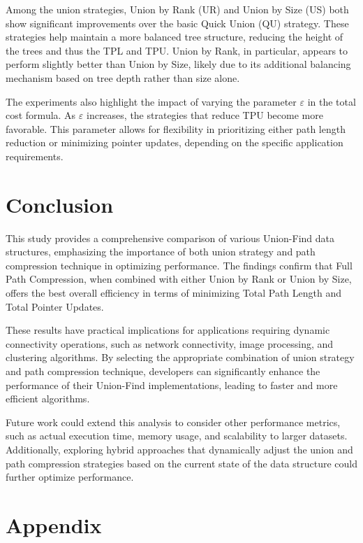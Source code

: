 \documentclass[10pt,a4paper,hidelinks]{article}
\begin{document}
Among the union strategies, Union by Rank (UR) and Union by Size (US) both show significant improvements over the basic Quick Union (QU) strategy. These strategies help maintain a more balanced tree structure, reducing the height of the trees and thus the TPL and TPU. Union by Rank, in particular, appears to perform slightly better than Union by Size, likely due to its additional balancing mechanism based on tree depth rather than size alone.

The experiments also highlight the impact of varying the parameter $\varepsilon$ in the total cost formula. As $\varepsilon$ increases, the strategies that reduce TPU become more favorable. This parameter allows for flexibility in prioritizing either path length reduction or minimizing pointer updates, depending on the specific application requirements.

\section{Conclusion}

This study provides a comprehensive comparison of various Union-Find data structures, emphasizing the importance of both union strategy and path compression technique in optimizing performance. The findings confirm that Full Path Compression, when combined with either Union by Rank or Union by Size, offers the best overall efficiency in terms of minimizing Total Path Length and Total Pointer Updates.

These results have practical implications for applications requiring dynamic connectivity operations, such as network connectivity, image processing, and clustering algorithms. By selecting the appropriate combination of union strategy and path compression technique, developers can significantly enhance the performance of their Union-Find implementations, leading to faster and more efficient algorithms.

Future work could extend this analysis to consider other performance metrics, such as actual execution time, memory usage, and scalability to larger datasets. Additionally, exploring hybrid approaches that dynamically adjust the union and path compression strategies based on the current state of the data structure could further optimize performance.


\section{Appendix}



\newpage
\listoffigures
\lstlistoflistings
\end{document}
